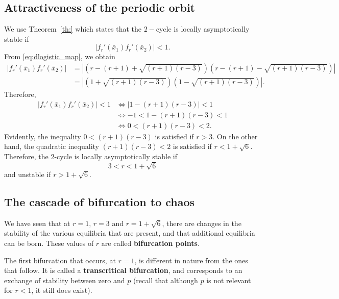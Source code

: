 \subsection{Attractiveness of the periodic orbit}
We use Theorem~\ref{th:} which states that the $2-$cycle is locally asymptotically stable if
\[
|f_r'(\bar x_1)f_r'(\bar x_2)|<1.
\]
From \eqref{eq:dlogistic_map}, we obtain
\begin{align*}
|f_r'(\bar x_1)f_r'(\bar x_2)|
&=\left|
\left(r-(r+1)+\sqrt{(r+1)(r-3)}\right)
\left(r-(r+1)-\sqrt{(r+1)(r-3)}\right)
\right| \\
&=\left|
\left(1+\sqrt{(r+1)(r-3)}\right)
\left(1-\sqrt{(r+1)(r-3)}\right)
\right|.
\end{align*}
Therefore,
\begin{align*}
|f_r'(\bar x_1)f_r'(\bar x_2)|<1 &\Leftrightarrow |1-(r+1)(r-3)|<1 \\
&\Leftrightarrow -1<1-(r+1)(r-3)<1 \\
&\Leftrightarrow 0<(r+1)(r-3)<2.
\end{align*}
Evidently, the inequality $0<(r+1)(r-3)$ is satisfied if $r>3$. On the other hand, the quadratic inequality $(r+1)(r-3)<2$ is satisfied if $r<1+\sqrt{6}$.
Therefore, the 2-cycle is locally asymptotically stable if 
\[
3<r<1+\sqrt{6}
\]
and unstable if $r>1+\sqrt{6}$.






\subsection{The cascade of bifurcation to chaos}
\label{sec:chaos}
We have seen that at $r=1$, $r=3$ and $r=1+\sqrt{6}$, there are changes in the stability of the various equilibria that are present, and that additional equilibria can be born. These values of $r$ are called \textbf{bifurcation points}. 

The first bifurcation that occurs, at $r=1$, is different in nature from the ones that follow. It is called a \textbf{transcritical bifurcation}, and corresponds to an exchange of stability between zero and $p$ (recall that although $p$ is not relevant for $r<1$, it still does exist). 

